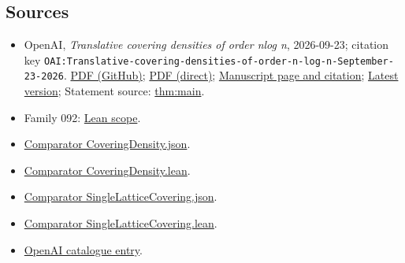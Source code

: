 \documentclass[11pt]{article}
\begin{document}
\subsection{Sources}
\begin{itemize}
\item OpenAI, \emph{Translative covering densities of order nlog n}, 2026-09-23; citation key \texttt{OAI:Translative-covering-densities-of-order-n-log-n-September-23-2026}. \href{https://github.com/openai/math/blob/adc7f1241b42e322a6451854ab7e4b4c146bf78a/preprints/Translative-covering-densities-of-order-n-log-n-September-23-2026/paper.pdf}{PDF (GitHub)}; \href{https://github.com/openai/math/raw/adc7f1241b42e322a6451854ab7e4b4c146bf78a/preprints/Translative-covering-densities-of-order-n-log-n-September-23-2026/paper.pdf}{PDF (direct)}; \href{https://github.com/openai/math/blob/adc7f1241b42e322a6451854ab7e4b4c146bf78a/preprints/Translative-covering-densities-of-order-n-log-n-September-23-2026/README.md}{Manuscript page and citation}; \href{https://github.com/openai/math/blob/main/preprints/Translative-covering-densities-of-order-n-log-n-September-23-2026/paper.pdf}{Latest version}; Statement source: \href{https://github.com/openai/math/blob/adc7f1241b42e322a6451854ab7e4b4c146bf78a/preprints/Translative-covering-densities-of-order-n-log-n-September-23-2026/build/sections/01-introduction.tex\#L49}{thm:main}.
\item Family 092: \href{https://github.com/openai/math/blob/adc7f1241b42e322a6451854ab7e4b4c146bf78a/lean/docs/092.md}{Lean scope}.
\item \href{https://github.com/openai/math/blob/adc7f1241b42e322a6451854ab7e4b4c146bf78a/lean/ComparatorChallenges/CoveringDensity.json}{Comparator CoveringDensity.json}.
\item \href{https://github.com/openai/math/blob/adc7f1241b42e322a6451854ab7e4b4c146bf78a/lean/ComparatorChallenges/CoveringDensity.lean}{Comparator CoveringDensity.lean}.
\item \href{https://github.com/openai/math/blob/adc7f1241b42e322a6451854ab7e4b4c146bf78a/lean/ComparatorChallenges/SingleLatticeCovering.json}{Comparator SingleLatticeCovering.json}.
\item \href{https://github.com/openai/math/blob/adc7f1241b42e322a6451854ab7e4b4c146bf78a/lean/ComparatorChallenges/SingleLatticeCovering.lean}{Comparator SingleLatticeCovering.lean}.
\item \href{https://github.com/openai/math/blob/adc7f1241b42e322a6451854ab7e4b4c146bf78a/CONTENTS.md}{OpenAI catalogue entry}.
\end{itemize}
\end{document}
